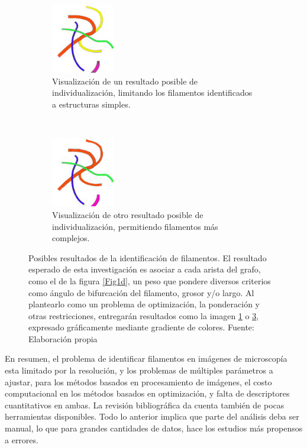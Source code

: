 \begin{figure}[h]
    \begin{subfigure}[t]{0.5\textwidth}
        \centering
        \includegraphics[height=1.2in]{imagenes/define-weighted-4-expected2.png}
        \caption{Visualizaci\'on de un resultado posible de individualizaci\'on, limitando los filamentos identificados a estructuras simples.}
        \label{Fig2a}
    \end{subfigure}
    ~ 
    \begin{subfigure}[t]{0.5\textwidth}
        \centering
        \includegraphics[height=1.2in]{imagenes/define-weighted-4-expected1.png}
        \caption{Visualizaci\'on de otro resultado posible de individualizaci\'on, permitiendo filamentos m\'as complejos.}
        \label{Fig2b}
    \end{subfigure}
	\caption{Posibles resultados de la identificaci\'on de filamentos. El resultado esperado de esta investigaci\'on es asociar a cada arista del grafo, como el de la figura \ref{Fig1d}, un peso que pondere diversos criterios como \'angulo de bifurcaci\'on del filamento, grosor y/o largo. Al plantearlo como un problema de optimizaci\'on, la ponderaci\'on y otras restricciones, entregar\'an resultados como la imagen \ref{Fig2a} o \ref{Fig2b}, expresado gr\'aficamente mediante gradiente de colores. Fuente: Elaboraci\'on propia}
\end{figure}

En resumen, el problema de identificar filamentos en im\'agenes de microscop\'ia esta limitado por la resoluci\'on, y los problemas de m\'ultiples par\'ametros a ajustar, para los m\'etodos basados en procesamiento de im\'agenes, el costo computacional en los m\'etodos basados en optimizaci\'on, y falta de descriptores cuantitativos en ambas. La revisi\'on bibliogr\'afica da cuenta tambi\'en de pocas herramientas disponibles. Todo lo anterior implica que parte del an\'alisis deba ser manual, lo que para grandes cantidades de datos, hace los estudios m\'as propensos a errores. 

